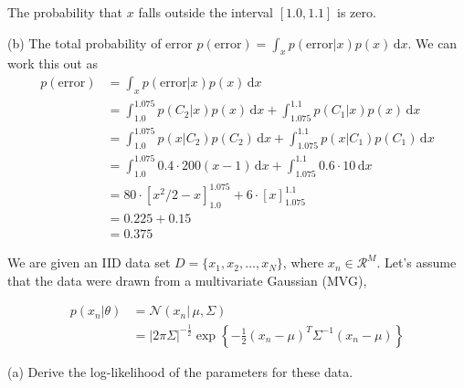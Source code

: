 \documentclass[a4paper]{article}
\newcommand{\N}{\mathcal{N}}
\newcommand{\mc}[1]{\mathcal{#1}}
\def\d#1{{\,\mathrm{d}#1}}
\begin{document}
\begin{ExerciseList}
The probability that $x$ falls outside the interval $[1.0,1.1]$ is zero.


\medskip
(b) The total probability of error $p(\text{error})=\int_x p(\text{error}|x)p(x)\d{x}$. We can work this out as
\begin{align*}
p(\text{error}) &= \int_x p(\text{error}|x)p(x)\d{x}\\
&= \int_{1.0}^{1.075} p(C_2|x)p(x)\d{x} + \int_{1.075}^{1.1} p(C_1|x)p(x)\d{x}\\
&= \int_{1.0}^{1.075} p(x|C_2)p(C_2)\d{x} + \int_{1.075}^{1.1} p(x|C_1)p(C_1)\d{x}\\
&= \int_{1.0}^{1.075}0.4\cdot 200(x-1)\d{x} + \int_{1.075}^{1.1} 0.6\cdot 10\d{x}\\
&=80\cdot[x^2/2-x]_{1.0}^{1.075} + 6\cdot[x]_{1.075}^{1.1}\\
&=0.225 + 0.15\\
&=0.375
\end{align*}




\medskip

%




\Exercise[label={ex:ML-MVG}]

 We are given an IID data set $D = \{x_1,x_2,\ldots,x_N\}$, where $x_n \in \mc{R}^M$. Let's assume that the data were drawn from a multivariate Gaussian (MVG),

    \begin{align*}
p(x_n|\theta) &= \N(x_n|\,\mu,\Sigma) \\
    &= |2 \pi \Sigma|^{-\frac{1}{2}} \exp\left\{-\frac{1}{2}(x_n-\mu)^T
\Sigma^{-1} (x_n-\mu) \right\}
\end{align*}

(a) Derive the log-likelihood of the parameters for these data.\\


\end{ExerciseList}
\end{document}
